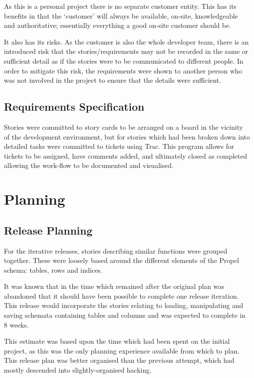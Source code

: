 As this is a personal project there is no separate customer entity. This has its benefits in that the `customer' will always be available, on-site, knowledgeable and authoritative; essentially everything a good on-site customer should be.

It also has its risks. As the customer is also the whole developer team, there is an introduced risk that the stories\slash requirements may not be recorded in the same or sufficient detail as if the stories were to be communicated to different people. In order to mitigate this risk, the requirements were shown to another person who was not involved in the project to ensure that the details were sufficient.

\subsection{Requirements Specification}
Stories were committed to story cards to be arranged on a board in the vicinity of the development environment, but for stories which had been broken down into detailed tasks were committed to tickets using Trac. This program allows for tickets to be assigned, have comments added, and ultimately closed as completed allowing the work-flow to be documented and visualised.

\section{Planning}
\subsection{Release Planning}
For the iterative releases, stories describing similar functions were grouped together. These were loosely based around the different elements of the Propel schema: tables, rows and indices.

It was known that in the time which remained after the original plan was abandoned that it should have been possible to complete one release iteration. This release would incorporate the stories relating to loading, manipulating and saving schemata containing tables and columns and was expected to complete in 8 weeks.

This estimate was based upon the time which had been spent on the initial project, as this was the only planning experience available from which to plan. This release plan was better organised than the previous attempt, which had mostly descended into slightly-organised hacking.

